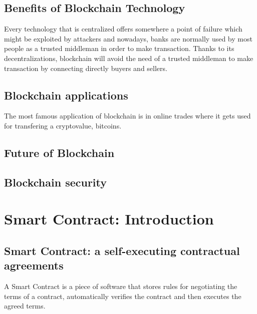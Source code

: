 \subsection{Benefits of Blockchain Technology}
Every technology that is centralized offers somewhere a point of failure which might be exploited by attackers and nowadays, banks are normally used by most people as a trusted middleman in order to make transaction.
Thanks to its decentralizations, blockchain will avoid the need of a trusted middleman to make transaction by connecting directly buyers and sellers.

\subsection{Blockchain applications}
The most famous application of blockchain is in online trades where it gets used for transfering a cryptovalue, bitcoins.


\subsection{Future of Blockchain}

\subsection{Blockchain security}


\section{Smart Contract: Introduction}
\subsection{Smart Contract: a self-executing contractual agreements}
A Smart Contract is a piece of software that stores rules for negotiating the terms of a contract, automatically verifies the contract and then executes the agreed terms. 

